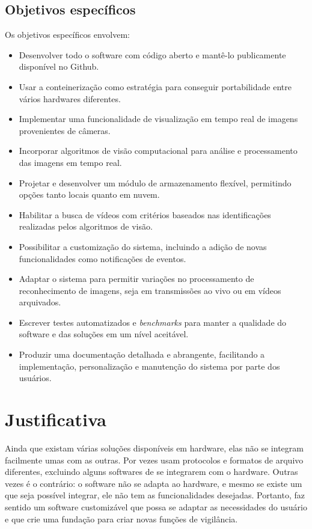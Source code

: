 \documentclass[12pt, %
openright, 
oneside, %
a4paper,    %
brazil]{facom-ufu-abntex2}
\begin{document}
\subsection{Objetivos específicos}

Os objetivos específicos envolvem:

\begin{itemize}
	\item Desenvolver todo o software com código aberto e mantê-lo publicamente
	      disponível no Github.
	\item Usar a conteinerização como estratégia para conseguir portabilidade entre
	      vários hardwares diferentes.
	\item Implementar uma funcionalidade de visualização em tempo real de imagens
	      provenientes de câmeras.
	\item Incorporar algoritmos de visão computacional para análise e processamento das
	      imagens em tempo real.
	\item Projetar e desenvolver um módulo de armazenamento flexível, permitindo opções
	      tanto locais quanto em nuvem.
	\item Habilitar a busca de vídeos com critérios baseados nas identificações
	      realizadas pelos algoritmos de visão.
	\item Possibilitar a customização do sistema, incluindo a adição de novas
	      funcionalidades como notificações de eventos.
	\item Adaptar o sistema para permitir variações no processamento de reconhecimento de
	      imagens, seja em transmissões ao vivo ou em vídeos arquivados.
	\item Escrever testes automatizados e \textit{\foreignlanguage{english}{benchmarks}}
	      para manter a qualidade do software e das soluções em um nível aceitável.
	\item Produzir uma documentação detalhada e abrangente, facilitando a implementação,
	      personalização e manutenção do sistema por parte dos usuários.
\end{itemize}

\section{Justificativa}

Ainda que existam várias soluções disponíveis em hardware, elas não se integram
facilmente umas com as outras. Por vezes usam protocolos e formatos de arquivo
diferentes, excluindo alguns softwares de se integrarem com o hardware. Outras
vezes é o contrário: o software não se adapta ao hardware, e mesmo se existe um
que seja possível integrar, ele não tem as funcionalidades desejadas. Portanto,
faz sentido um software customizável que possa se adaptar as necessidades do
usuário e que crie uma fundação para criar novas funções de vigilância.
\end{document}

